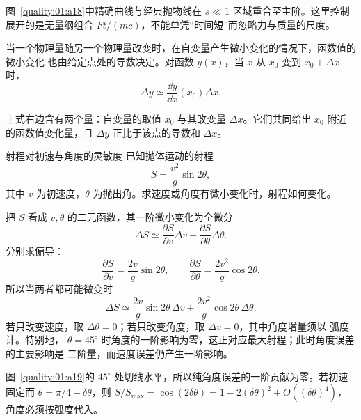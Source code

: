 {\begin{xesolution}

图~\ref{quality:01:a18}中精确曲线与经典抛物线在 $s\ll1$ 区域重合至主阶。这里控制展开的是无量纲组合 $Ft/(mc)$，不能单凭“时间短”而忽略力与质量的尺度。
\end{xesolution}

当一个物理量随另一个物理量改变时，在自变量产生微小变化的情况下，函数值的微小变化
也由给定点处的导数决定。对函数 $y(x)$，当 $x$ 从 $x_0$ 变到 $x_0+\Delta x$ 时，
\begin{equation}
 \Delta y\simeq\frac{\dd y}{\dd x}(x_0)\Delta x.
\end{equation}

\incrementDiagram

上式右边含有两个量：自变量的取值 $x_0$ 与其改变量 $\Delta x$。它们共同给出 $x_0$
附近的函数值变化量，且 $\Delta y$ 正比于该点的导数和 $\Delta x$。

\begin{origexamplebox}{射程对初速与角度的灵敏度}\label{ch01:ex:s14-1-15}
已知抛体运动的射程
\[
 S=\frac{v^2}{g}\sin2\theta,
\]
其中 $v$ 为初速度，$\theta$ 为抛出角。求速度或角度有微小变化时，射程如何变化。

\end{origexamplebox}

\begin{xesolution}
把 $S$ 看成 $v,\theta$ 的二元函数，其一阶微小变化为全微分
\[
 \Delta S\simeq
 \frac{\partial S}{\partial v}\Delta v
 +\frac{\partial S}{\partial\theta}\Delta\theta.
\]
分别求偏导：
\[
 \frac{\partial S}{\partial v}=\frac{2v}{g}\sin2\theta,\qquad
 \frac{\partial S}{\partial\theta}=\frac{2v^2}{g}\cos2\theta.
\]
所以当两者都可能微变时
\[
 \boxed{\Delta S\simeq
 \frac{2v}{g}\sin2\theta\,\Delta v
 +\frac{2v^2}{g}\cos2\theta\,\Delta\theta}.
\]
若只改变速度，取 $\Delta\theta=0$；若只改变角度，取 $\Delta v=0$，其中角度增量须以
弧度计。特别地，
$\theta=45^\circ$ 时角度的一阶影响为零，这正对应最大射程；此时角度误差的主要影响是
二阶量，而速度误差仍产生一阶影响。


图~\ref{quality:01:a19}的 $45^\circ$ 处切线水平，所以纯角度误差的一阶贡献为零。若初速固定而 $\theta=\pi/4+\delta\theta$，则 $S/S_{\max}=\cos(2\delta\theta)=1-2(\delta\theta)^2+O((\delta\theta)^4)$，角度必须按弧度代入。
\end{xesolution}

}
